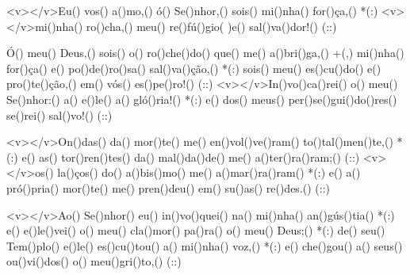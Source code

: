 <v></v>Eu() vos() a()mo,() ó() Se()nhor,() sois() mi()nha() for()ça,() *(:)
<v></v>mi()nha() ro()cha,() meu() re()fú()gio( )e() sal()va()dor!() (::)

Ó() meu() Deus,() sois() o() ro()che()do() que() me() a()bri()ga,() +(,)
mi()nha() for()ça() e() po()de()ro()sa() sal()va()ção,() *(:)
sois() meu() es()cu()do() e() pro()te()ção,() em() vós() es()pe()ro!() (::)
<v></v>In()vo()ca()rei() o() meu() Se()nhor:() a() e()le() a() gló()ria!() *(:)
e() dos() meus() per()se()gui()do()res() se()rei() sal()vo!() (::)

<v></v>On()das() da() mor()te() me() en()vol()ve()ram() to()tal()men()te,() *(:)
e() as() tor()ren()tes() da() mal()da()de() me() a()ter()ra()ram;() (::)
<v></v>os() la()ços() do() a()bis()mo() me() a()mar()ra()ram() *(:)
e() a() pró()pria() mor()te() me() pren()deu() em() su()as() re()des.() (::)

<v></v>Ao() Se()nhor() eu() in()vo()quei() na() mi()nha() an()gús()tia() *(:)
e() e()le()vei() o() meu() cla()mor() pa()ra() o() meu() Deus;() *(:)
de() seu() Tem()plo() e()le() es()cu()tou() a() mi()nha() voz,() *(:)
e() che()gou() a() seus() ou()vi()dos() o() meu()gri()to,() (::)